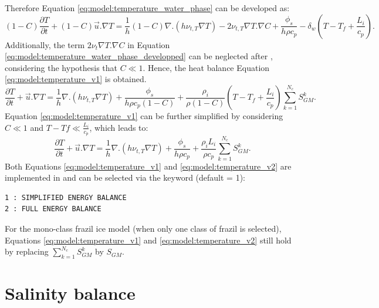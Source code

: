 Therefore Equation \eqref{eq:model:temperature_water_phase} can be developed as:
\begin{equation}
(1-C)\frac{\partial T}{\partial t}+(1-C) \vec{u}. \nabla T =
\dfrac{1}{h}  (1-C) \nabla .(h \nu_{t,T} \nabla T)-2 \nu_{t,T} \nabla T. \nabla C+\frac{\phi_s }{h \rho c_{p}}
- \delta_w \left( T - T_f + \frac{L_i}{ c_{p}} \right).
\label{eq:model:temperature_water_phase_developped}
\end{equation}
Additionally, the term $2 \nu_{t} \nabla T. \nabla C$ in Equation \eqref{eq:model:temperature_water_phase_developped} can be neglected after \cite{holland_JFM_2005}, considering the hypothesis that $C\ll1$.
Hence, the heat balance Equation \eqref{eq:model:temperature_v1} is obtained.
\begin{equation}
\frac{\partial T}{\partial t} + \vec{u}. \nabla T= \dfrac{1}{h} 
\nabla .(h \nu_{t,T} \nabla T)
+\frac{\phi_s }{h \rho c_{p} (1-C)}
+ \frac{ \rho_i}{ \rho (1-C)}
\left(T - T_f + \frac{L_i}{ c_{p}} \right) \sum_{k=1}^{N_c} S^k_{GM}.
\label{eq:model:temperature_v1}
\end{equation}
Equation \eqref{eq:model:temperature_v1} can be further simplified by considering $C\ll1$ and $T-Tf \ll \frac{L_i}{c_p}$, which leads to:
\begin{equation}
\frac{\partial T}{\partial t}+ \vec{u}. \nabla T= \dfrac{1}{h} \nabla .( h\nu_{t,T} \nabla T) + \frac{\phi_s }{h \rho c_{p}}
+\frac{\rho_i L_i}{\rho c_{p}} \sum_{k=1}^{N_c} S^k_{GM}.
\label{eq:model:temperature_v2}
\end{equation}
Both Equations \eqref{eq:model:temperature_v1} and \eqref{eq:model:temperature_v2} are implemented
in \khione and can be selected via the keyword  (default = 1):
\begin{lstlisting}
1 : SIMPLIFIED ENERGY BALANCE
2 : FULL ENERGY BALANCE
\end{lstlisting}

For the mono-class frazil ice model (when only one class of frazil is selected),
Equations \eqref{eq:model:temperature_v1} and \eqref{eq:model:temperature_v2} still
hold by replacing $\sum_{k=1}^{N_c} S^k_{GM}$ by $S_{GM}$.

\section{Salinity balance}
\label{salinity_balance}

